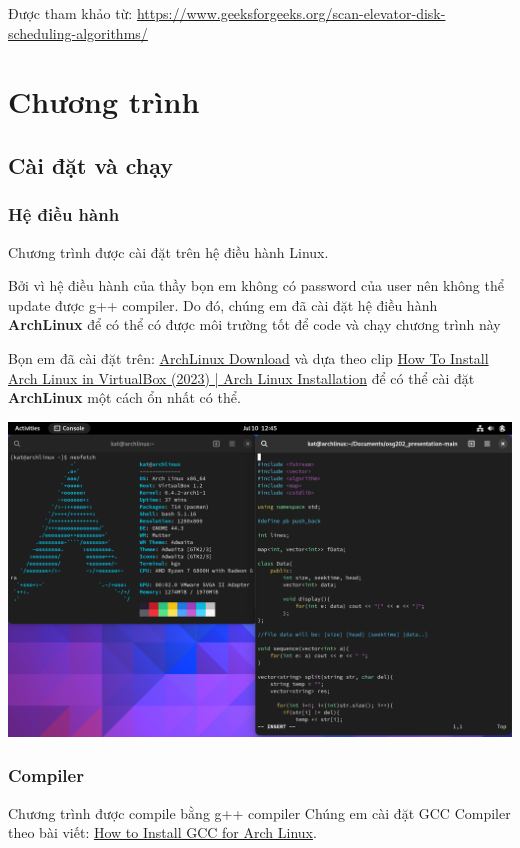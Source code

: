 \documentclass{report}
\begin{document}
    Được tham khảo từ: \href{https://www.geeksforgeeks.org/scan-elevator-disk-scheduling-algorithms/}{https://www.geeksforgeeks.org/scan-elevator-disk-scheduling-algorithms/}
    
\chapter{Chương trình}
    \section{Cài đặt và chạy}
        \subsection{Hệ điều hành}
        Chương trình được cài đặt trên hệ điều hành Linux.
        
        Bởi vì hệ điều hành của thầy bọn em không có password của user nên không thể update được g++ compiler. Do đó, chúng em đã cài đặt hệ điều hành \textbf{ArchLinux} để có thể có được môi trường tốt để code và chạy chương trình này

        Bọn em đã cài đặt trên: \href{https://archlinux.org/download/}{ArchLinux Download} và dựa theo clip \href{https://www.youtube.com/watch?v=FlQ-LyBDCoo}{How To Install Arch Linux in VirtualBox (2023) | Arch Linux Installation} để có thể cài đặt \textbf{ArchLinux} một cách ổn nhất có thể.

        \includegraphics[width = 14cm]{images/archlinux.png}
        
        \subsection{Compiler}
        Chương trình được compile bằng g++ compiler
        Chúng em cài đặt GCC Compiler theo bài viết: \href{https://linuxhint.com/install-gcc-arch-linux/}{How to Install GCC for Arch Linux}.
\end{document}
